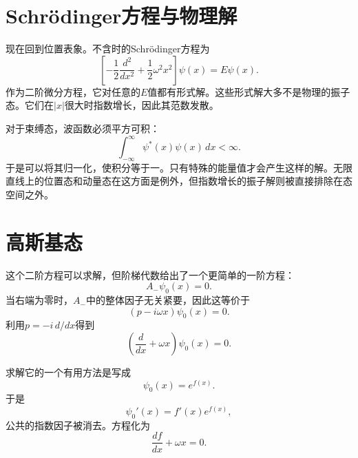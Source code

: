 \section{Schr\"odinger方程与物理解}

现在回到位置表象。不含时的Schr\"odinger方程为
\begin{equation}
\left[
-\frac12\frac{d^{2}}{dx^{2}}
+\frac12\omega^{2}x^{2}
\right]\psi(x)=E\psi(x).
\end{equation}
作为二阶微分方程，它对任意的\(E\)值都有形式解。这些形式解大多不是物理的振子态。它们在\(\lvert x\rvert\)很大时指数增长，因此其范数发散。

对于束缚态，波函数必须平方可积：
\begin{equation}
\int_{-\infty}^{\infty}\psi^{*}(x)\psi(x)\,dx<\infty.
\end{equation}
于是可以将其归一化，使积分等于一。只有特殊的能量值才会产生这样的解。无限直线上的位置态和动量态在这方面是例外，但指数增长的振子解则被直接排除在态空间之外。

\section{高斯基态}

这个二阶方程可以求解，但阶梯代数给出了一个更简单的一阶方程：
\begin{equation}
A_{-}\psi_{0}(x)=0.
\end{equation}
当右端为零时，\(A_{-}\)中的整体因子无关紧要，因此这等价于
\begin{equation}
(p-i\omega x)\psi_{0}(x)=0.
\end{equation}
利用\(p=-i\,d/dx\)得到
\begin{equation}
\left(\frac{d}{dx}+\omega x\right)\psi_{0}(x)=0.
\end{equation}

\begin{classroomqa}
\end{classroomqa}

求解它的一个有用方法是写成
\begin{equation}
\psi_{0}(x)=e^{f(x)}.
\end{equation}
于是
\[
\psi_{0}'(x)=f'(x)e^{f(x)},
\]
公共的指数因子被消去。方程化为
\begin{equation}
\frac{df}{dx}+\omega x=0.
\end{equation}

